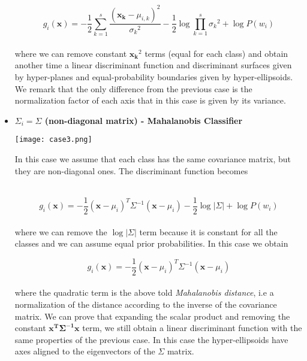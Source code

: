 \documentclass{standalone}
\begin{document}
\begin{itemize}
\begin{equation}
g_i(\mathbf{x}) = -\frac{1}{2}\sum_{k=1}^{s}\frac{(\mathbf{x_k}-\mu_{i,k})^2}{{\sigma_k}^2}-\frac{1}{2}\log\prod_{k=1}^{s}{\sigma_k}^2+\log P(w_i)
\end{equation}
\\
where we can remove constant $\mathbf{x_k}^2$ terms (equal for each class) and obtain another time a linear discriminant function and discriminant surfaces given by hyper-planes and equal-probability boundaries given by hyper-ellipsoids.
We remark that the only difference from the previous case is the normalization factor of each axis that in this case is given by its variance.

\item \textbf{$\Sigma_i = \Sigma$ (non-diagonal matrix) - Mahalanobis Classifier}

\begin{minipage}{.30\textwidth}
\hspace{-.5cm}
\texttt{[image: case3.png]}
\end{minipage}%
\begin{minipage}{.70\textwidth}
In this case we assume that each class has the same covariance matrix, but they are non-diagonal ones.
The discriminant function becomes
\end{minipage}\\

\begin{equation}
g_i(\mathbf{x}) = -\frac{1}{2}(\mathbf{x}-\mu_i)^T{\Sigma}^{-1}(\mathbf{x}-\mu_i) -\frac{1}{2}\log\left|\Sigma\right|+\log P(w_i)
\end{equation}
\\
where we can remove the $\log\left|\Sigma\right|$ term because it is constant for all the classes and we can assume equal prior probabilities.
In this case we obtain

\begin{equation}
g_i(\mathbf{x}) = -\frac{1}{2}(\mathbf{x}-\mu_i)^T{\Sigma}^{-1}(\mathbf{x}-\mu_i)
\end{equation}
\\
where the quadratic term is the above told \emph{Mahalanobis distance}, i.e a normalization of the distance according to the inverse of the covariance matrix.
We can prove that expanding the scalar product and removing the constant $\mathbf{x^T\Sigma^{-1}x}$ term, we still obtain a linear discriminant function with the same properties of the previous case.
In this case the hyper-ellipsoids have axes aligned to the eigenvectors of the $\Sigma$ matrix.


\end{itemize}
\end{document}
